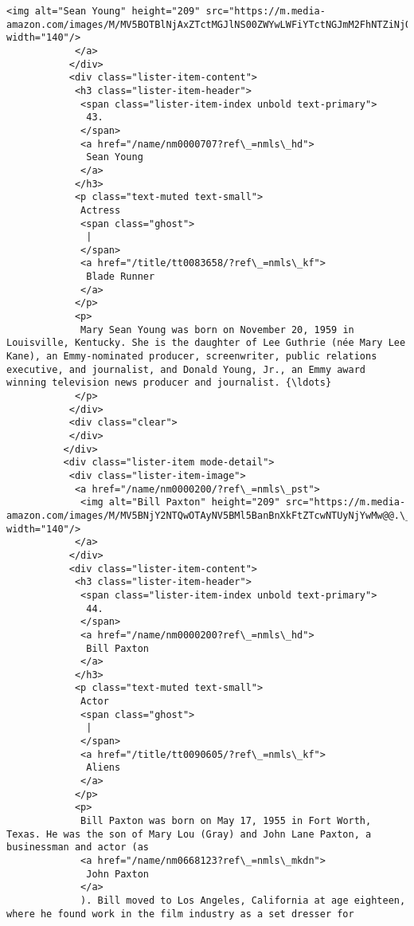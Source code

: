 \documentclass[11pt]{article}
\begin{document}
\begin{Verbatim}[commandchars=\\\{\}]
             <img alt="Sean Young" height="209" src="https://m.media-amazon.com/images/M/MV5BOTBlNjAxZTctMGJlNS00ZWYwLWFiYTctNGJmM2FhNTZiNjQyL2ltYWdlXkEyXkFqcGdeQXVyMjIzODg1ODM@.\_V1\_UY209\_CR116,0,140,209\_AL\_.jpg" width="140"/>
            </a>
           </div>
           <div class="lister-item-content">
            <h3 class="lister-item-header">
             <span class="lister-item-index unbold text-primary">
              43.
             </span>
             <a href="/name/nm0000707?ref\_=nmls\_hd">
              Sean Young
             </a>
            </h3>
            <p class="text-muted text-small">
             Actress
             <span class="ghost">
              |
             </span>
             <a href="/title/tt0083658/?ref\_=nmls\_kf">
              Blade Runner
             </a>
            </p>
            <p>
             Mary Sean Young was born on November 20, 1959 in Louisville, Kentucky. She is the daughter of Lee Guthrie (née Mary Lee Kane), an Emmy-nominated producer, screenwriter, public relations executive, and journalist, and Donald Young, Jr., an Emmy award winning television news producer and journalist. {\ldots}
            </p>
           </div>
           <div class="clear">
           </div>
          </div>
          <div class="lister-item mode-detail">
           <div class="lister-item-image">
            <a href="/name/nm0000200/?ref\_=nmls\_pst">
             <img alt="Bill Paxton" height="209" src="https://m.media-amazon.com/images/M/MV5BNjY2NTQwOTAyNV5BMl5BanBnXkFtZTcwNTUyNjYwMw@@.\_V1\_UY209\_CR6,0,140,209\_AL\_.jpg" width="140"/>
            </a>
           </div>
           <div class="lister-item-content">
            <h3 class="lister-item-header">
             <span class="lister-item-index unbold text-primary">
              44.
             </span>
             <a href="/name/nm0000200?ref\_=nmls\_hd">
              Bill Paxton
             </a>
            </h3>
            <p class="text-muted text-small">
             Actor
             <span class="ghost">
              |
             </span>
             <a href="/title/tt0090605/?ref\_=nmls\_kf">
              Aliens
             </a>
            </p>
            <p>
             Bill Paxton was born on May 17, 1955 in Fort Worth, Texas. He was the son of Mary Lou (Gray) and John Lane Paxton, a businessman and actor (as
             <a href="/name/nm0668123?ref\_=nmls\_mkdn">
              John Paxton
             </a>
             ). Bill moved to Los Angeles, California at age eighteen, where he found work in the film industry as a set dresser for

\end{Verbatim}
\end{document}
